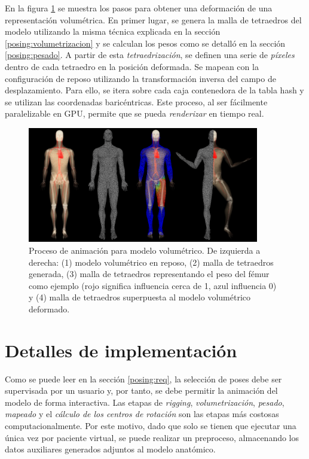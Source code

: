 En la figura \ref{fig:volEx} se muestra los pasos para obtener una deformación de una representación volumétrica. En primer lugar, se genera la malla de tetraedros del modelo utilizando la misma técnica explicada en la sección \ref{posing:volumetrizacion}  y se calculan los pesos como se detalló en la sección \ref{posing:pesado}. A partir de esta \emph{tetraedrización}, se definen una serie de \emph{píxeles} dentro de cada tetraedro en la posición deformada. Se mapean con la configuración de reposo utilizando la transformación inversa del campo de desplazamiento. Para ello, se itera sobre cada caja contenedora de la \ac{tabla hash} y se utilizan las coordenadas baricéntricas. Este proceso, al ser fácilmente paralelizable en \ac{GPU}, permite que se pueda \emph{renderizar} en tiempo real.


\begin{figure}[!ht]%
   \centering
   \includegraphics[width=0.90\textwidth]{IMG/Volumetric}
    \caption{Proceso de animación para modelo volumétrico. De izquierda a derecha: (1) modelo volumétrico en reposo, (2) malla de tetraedros generada, (3) malla de tetraedros representando el peso del fémur como ejemplo (rojo significa influencia cerca de 1, azul influencia 0) y (4) malla de tetraedros superpuesta al modelo volumétrico deformado. }
    \label{fig:volEx}
\end{figure}


\section{Detalles de implementación}
\label{posing:preprocess}

Como se puede leer en la sección \ref{posing:req}, la selección de poses debe ser supervisada por un usuario y, por tanto, se debe permitir la animación del modelo de forma interactiva. 
Las etapas de \emph{rigging}, \emph{volumetrización}, \emph{pesado}, \emph{mapeado} y el \emph{cálculo de los centros de rotación} son las etapas más costosas computacionalmente. 
Por este motivo, dado que solo se tienen que ejecutar una única vez por paciente virtual, se puede realizar un preproceso, almacenando los datos auxiliares generados adjuntos al modelo anatómico. 

